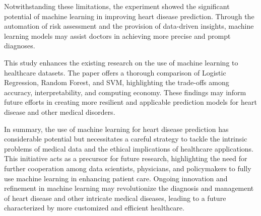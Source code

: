 Notwithstanding these limitations, the experiment showed the significant potential of machine learning in improving heart disease prediction. Through the automation of risk assessment and the provision of data-driven insights, machine learning models may assist doctors in achieving more precise and prompt diagnoses. 

This study enhances the existing research on the use of machine learning to healthcare datasets. The paper offers a thorough comparison of Logistic Regression, Random Forest, and SVM, highlighting the trade-offs among accuracy, interpretability, and computing economy. These findings may inform future efforts in creating more resilient and applicable prediction models for heart disease and other medical disorders.

In summary, the use of machine learning for heart disease prediction has considerable potential but necessitates a careful strategy to tackle the intrinsic problems of medical data and the ethical implications of healthcare applications. This initiative acts as a precursor for future research, highlighting the need for further cooperation among data scientists, physicians, and policymakers to fully use machine learning in enhancing patient care. Ongoing innovation and refinement in machine learning may revolutionize the diagnosis and management of heart disease and other intricate medical diseases, leading to a future characterized by more customized and efficient healthcare.
